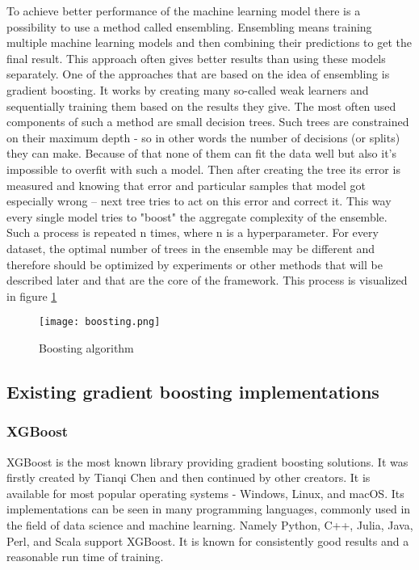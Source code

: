 \documentclass[a4paper,twoside,12pt]{book}
\newcommand*\setcaptioncitation[1]{\def\captioncitation{\textit{Source:}~#1}}
\let\captioncitation\relax
\begin{document}
To achieve better performance of the machine learning model there is a possibility to use a method called ensembling. Ensembling means training multiple machine learning models and then combining their predictions to get the final result. This approach often gives better results than using these models separately. 
One of the approaches that are based on the idea of ensembling is gradient boosting.
It works by creating many so-called weak learners and sequentially training them based on the results they give. The most often used components of such a method are small decision trees. Such trees are constrained on their maximum depth - so in other words the number of decisions (or splits) they can make. 
Because of that none of them can fit the data well but also it's impossible to overfit with such a model.
Then after creating the tree its error is measured and knowing that error and particular samples that model got especially wrong -- next tree tries to act on this error and correct it. This way every single model tries to "boost" the aggregate complexity of the ensemble. Such a process is repeated n times, where n is a hyperparameter. For every dataset, the optimal number of trees in the ensemble may be different and therefore should be optimized by experiments or other methods that will be described later and that are the core of the framework. This process is visualized in figure \ref{fig:boosting}  

\begin{figure}[!htb]
    \centering
    \texttt{[image: boosting.png]}
    \setcaptioncitation{\url{https://cutt.ly/ijfUC4m}}
    \caption{Boosting algorithm}
    \label{fig:boosting}
\end{figure}

\subsection{Existing gradient boosting implementations}

\subsubsection{XGBoost}

XGBoost \cite{chen2016xgboost} is the most known library providing gradient boosting solutions. It was firstly created by Tianqi Chen and then continued by other creators. It is available for most popular operating systems - Windows, Linux, and macOS. Its implementations can be seen in many programming languages, commonly used in the field of data science and machine learning. Namely Python, C++, Julia, Java, Perl, and Scala support XGBoost. It is known for consistently good results and a reasonable run time of training.
\end{document}
